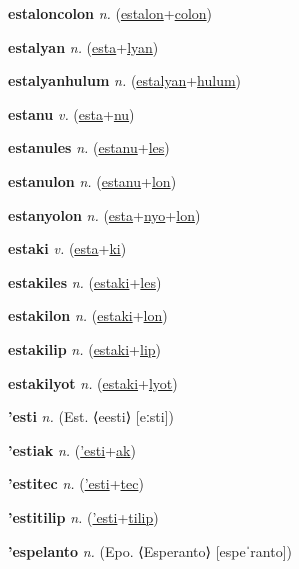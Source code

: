 \textbf{\hypertarget{estaloncolon}{estaloncolon}} \textit{n.} (\hyperlink{estalon}{estalon}+\allowbreak \hyperlink{colon}{colon})


\textbf{\hypertarget{estalyan}{estalyan}} \textit{n.} (\hyperlink{esta}{esta}+\allowbreak \hyperlink{lyan}{lyan})


\textbf{\hypertarget{estalyanhulum}{estalyanhulum}} \textit{n.} (\hyperlink{estalyan}{estalyan}+\allowbreak \hyperlink{hulum}{hulum})


\textbf{\hypertarget{estanu}{estanu}} \textit{v.} (\hyperlink{esta}{esta}+\allowbreak \hyperlink{nu}{nu})


\textbf{\hypertarget{estanules}{estanules}} \textit{n.} (\hyperlink{estanu}{estanu}+\allowbreak \hyperlink{les}{les})


\textbf{\hypertarget{estanulon}{estanulon}} \textit{n.} (\hyperlink{estanu}{estanu}+\allowbreak \hyperlink{lon}{lon})


\textbf{\hypertarget{estanyolon}{estanyolon}} \textit{n.} (\hyperlink{esta}{esta}+\allowbreak \hyperlink{nyo}{nyo}+\allowbreak \hyperlink{lon}{lon})


\textbf{\hypertarget{estaki}{estaki}} \textit{v.} (\hyperlink{esta}{esta}+\allowbreak \hyperlink{ki}{ki})


\textbf{\hypertarget{estakiles}{estakiles}} \textit{n.} (\hyperlink{estaki}{estaki}+\allowbreak \hyperlink{les}{les})


\textbf{\hypertarget{estakilon}{estakilon}} \textit{n.} (\hyperlink{estaki}{estaki}+\allowbreak \hyperlink{lon}{lon})


\textbf{\hypertarget{estakilip}{estakilip}} \textit{n.} (\hyperlink{estaki}{estaki}+\allowbreak \hyperlink{lip}{lip})


\textbf{\hypertarget{estakilyot}{estakilyot}} \textit{n.} (\hyperlink{estaki}{estaki}+\allowbreak \hyperlink{lyot}{lyot})


\textbf{\hypertarget{'esti}{'esti}} \textit{n.} (Est. ⟨eesti⟩ [eːsti])


\textbf{\hypertarget{'estiak}{'estiak}} \textit{n.} (\hyperlink{'esti}{'esti}+\allowbreak \hyperlink{ak}{ak})


\textbf{\hypertarget{'estitec}{'estitec}} \textit{n.} (\hyperlink{'esti}{'esti}+\allowbreak \hyperlink{tec}{tec})


\textbf{\hypertarget{'estitilip}{'estitilip}} \textit{n.} (\hyperlink{'esti}{'esti}+\allowbreak \hyperlink{tilip}{tilip})


\textbf{\hypertarget{'espelanto}{'espelanto}} \textit{n.} (Epo. ⟨Esperanto⟩ [espeˈranto])


